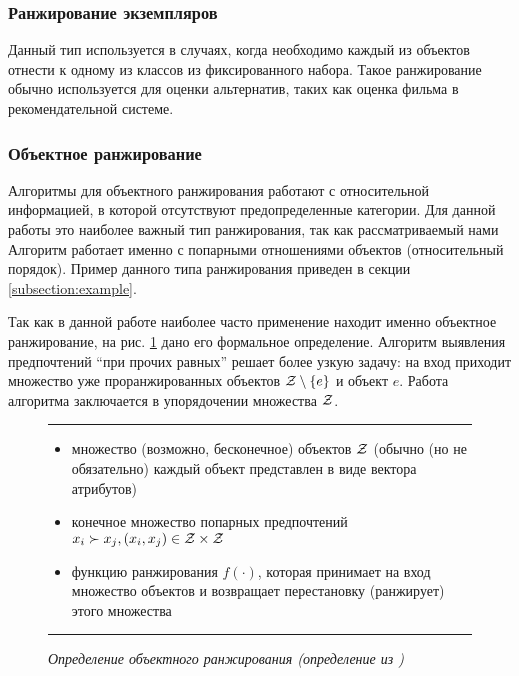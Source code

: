	\subsubsection{Ранжирование экземпляров}
		Данный тип используется в случаях, когда необходимо каждый из объектов отнести к одному из классов из фиксированного набора. Такое ранжирование обычно используется для оценки альтернатив, таких как оценка фильма в рекомендательной системе.
	
	\subsubsection{Объектное ранжирование}
		Алгоритмы для объектного ранжирования работают с 
		относительной %
		информацией, в которой отсутствуют предопределенные категории. Для данной работы это наиболее важный тип ранжирования, так как рассматриваемый нами Алгоритм работает именно с попарными отношениями объектов (относительный порядок). Пример данного типа ранжирования приведен в секции \ref{subsection:example}.
		
		Так как в данной работе наиболее часто применение находит именно объектное ранжирование, на рис. \ref{fig:object_ranking} дано его формальное определение. Алгоритм выявления предпочтений \enquote{при прочих равных} решает более узкую задачу: на вход приходит множество уже проранжированных объектов $\mathcal{Z} \setminus \{e\}$ и объект $e$. Работа алгоритма заключается в упорядочении множества $\mathcal{Z}$.
		
		\begin{figure}[h]
			\hrule
			\begin{description}[nosep]
				\item[Дано:] \null\leavevmode
				\begin{itemize}[itemsep=0pt,leftmargin=2ex,label=\textbf{---}]
					\item множество (возможно, бесконечное) объектов $\mathcal{Z}$ (обычно (но не обязательно) каждый объект представлен в виде вектора атрибутов)
					\item конечное множество попарных предпочтений $x_i \succ x_j, (x_i, x_j) \in \mathcal{Z} \times \mathcal{Z}$
				\end{itemize}
				\item[Найти:] \null\leavevmode
				\begin{itemize}[itemsep=0pt,leftmargin=2ex,label=\textbf{---}]
					\item функцию ранжирования $f(\cdot)$, которая принимает на вход множество объектов и возвращает перестановку (ранжирует) этого множества
				\end{itemize}
			\end{description} 
			\hrule
			\caption{\it Определение объектного ранжирования (определение из \cite[Рис.~3]{plbook:Introduction:2010})}
			\label{fig:object_ranking}
		\end{figure}
	

